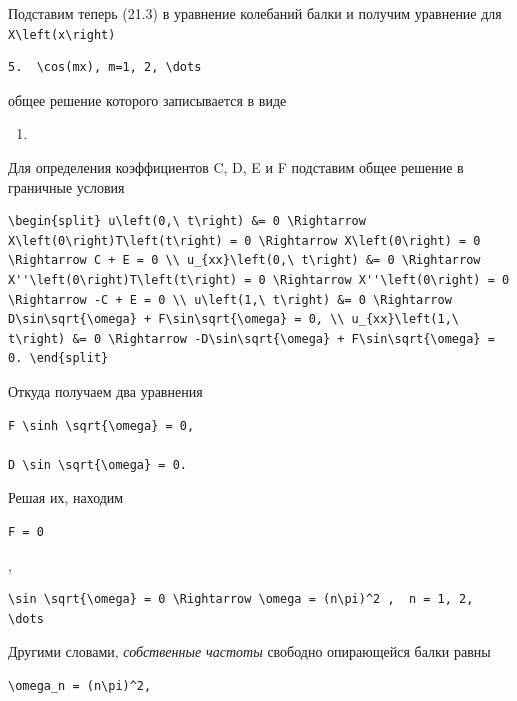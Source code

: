 \documentclass[
  ukrainian,
]{article}
\providecommand{\tightlist}{%
  \setlength{\itemsep}{0pt}\setlength{\parskip}{0pt}}
\begin{document}
Подставим теперь (21.3) в уравнение колебаний балки и получим уравнение
для \texttt{X\textbackslash{}left(x\textbackslash{}right)}

\begin{verbatim}
5.  \cos(mx), m=1, 2, \dots
\end{verbatim}

общее решение которого записывается в виде

\begin{enumerate}
\def\labelenumi{\arabic{enumi}.}
\setcounter{enumi}{5}
\tightlist
\item
\end{enumerate}

Для определения коэффициентов C, D, E и F подставим общее решение в
граничные условия

\begin{verbatim}
\begin{split} u\left(0,\ t\right) &= 0 \Rightarrow X\left(0\right)T\left(t\right) = 0 \Rightarrow X\left(0\right) = 0 \Rightarrow C + E = 0 \\ u_{xx}\left(0,\ t\right) &= 0 \Rightarrow X''\left(0\right)T\left(t\right) = 0 \Rightarrow X''\left(0\right) = 0 \Rightarrow -C + E = 0 \\ u\left(1,\ t\right) &= 0 \Rightarrow D\sin\sqrt{\omega} + F\sin\sqrt{\omega} = 0, \\ u_{xx}\left(1,\ t\right) &= 0 \Rightarrow -D\sin\sqrt{\omega} + F\sin\sqrt{\omega} = 0. \end{split}
\end{verbatim}

Откуда получаем два уравнения

\begin{verbatim}
F \sinh \sqrt{\omega} = 0,

D \sin \sqrt{\omega} = 0.
\end{verbatim}

Решая их, находим

\begin{verbatim}
F = 0
\end{verbatim}

,

\begin{verbatim}
\sin \sqrt{\omega} = 0 \Rightarrow \omega = (n\pi)^2 ,  n = 1, 2, \dots
\end{verbatim}

Другими словами, \emph{собственные частоты} свободно опирающейся балки
равны

\begin{verbatim}
\omega_n = (n\pi)^2,
\end{verbatim}
\end{document}
